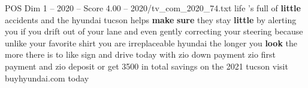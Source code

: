 \begin{textsample}{POS Dim 1 – 2020 – Score 4.00 – 2020/tv\_com\_2020\_74.txt}  \label{ex:f1_pos_083}
life 's full of \textbf{little} accidents and the hyundai tucson helps \textbf{make} \textbf{sure} they stay \textbf{little} by alerting you if you drift out of your lane and even gently correcting your steering because unlike your favorite shirt you are irreplaceable hyundai the longer you \textbf{look} the more there is to like sign and drive today with zio down payment zio first payment and zio deposit or get 3500 in total savings on the 2021 tucson visit buyhyundai.com today

\end{textsample}
